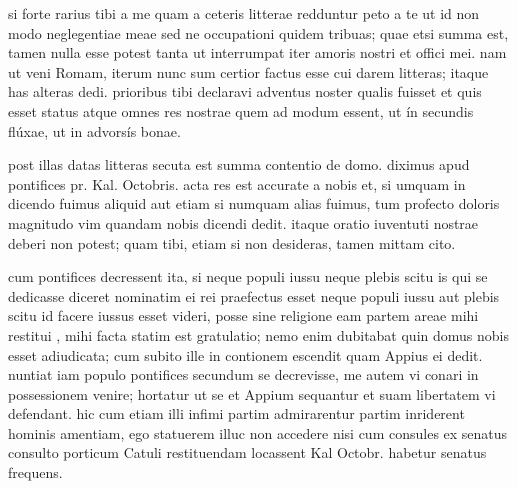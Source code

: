 


 si forte rarius tibi a me quam a ceteris litterae redduntur peto a te ut id non modo neglegentiae meae sed ne occupationi quidem tribuas; quae etsi summa est, tamen nulla esse potest tanta ut interrumpat iter amoris nostri et offici mei. nam ut veni Romam, iterum nunc sum certior factus esse cui darem litteras; itaque has alteras dedi. prioribus tibi declaravi adventus noster qualis fuisset et quis esset status atque omnes res nostrae quem ad modum essent, ut ín secundis flúxae, ut in advorsís bonae.

 post illas datas litteras secuta est summa contentio de domo. diximus apud pontifices pr. Kal. Octobris. acta res est accurate a nobis et, si umquam in dicendo fuimus aliquid aut etiam si numquam alias fuimus, tum profecto doloris magnitudo vim quandam nobis dicendi dedit. itaque oratio iuventuti nostrae deberi non potest; quam tibi, etiam si non desideras, tamen mittam cito.

 cum pontifices decressent ita, si neque populi iussu neque plebis scitu is qui se dedicasse diceret nominatim ei rei praefectus esset neque populi iussu aut plebis scitu id facere iussus esset videri, posse sine religione eam partem areae mihi restitui , mihi facta statim est gratulatio; nemo enim dubitabat quin domus nobis esset adiudicata; cum subito ille in contionem escendit quam Appius ei dedit. nuntiat iam populo pontifices secundum se decrevisse, me autem vi conari in possessionem venire; hortatur ut se et Appium sequantur et suam libertatem vi defendant. hic cum etiam illi infimi partim admirarentur partim inriderent hominis amentiam, ego statuerem illuc non accedere nisi cum consules ex senatus consulto porticum Catuli restituendam locassent Kal Octobr. habetur senatus frequens.

